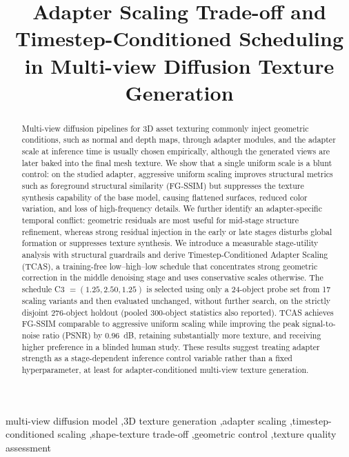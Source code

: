 \documentclass[times,twocolumn,final]{elsarticle}
\begin{document}
\begin{frontmatter}

\title{Adapter Scaling Trade-off and Timestep-Conditioned Scheduling in Multi-view Diffusion Texture Generation}


\begin{abstract}
Multi-view diffusion pipelines for 3D asset texturing commonly inject geometric conditions, such as normal and depth maps, through adapter modules, and the adapter scale at inference time is usually chosen empirically, although the generated views are later baked into the final mesh texture. We show that a single uniform scale is a blunt control: on the studied adapter, aggressive uniform scaling improves structural metrics such as foreground structural similarity (FG-SSIM) but suppresses the texture synthesis capability of the base model, causing flattened surfaces, reduced color variation, and loss of high-frequency details. We further identify an adapter-specific temporal conflict: geometric residuals are most useful for mid-stage structure refinement, whereas strong residual injection in the early or late stages disturbs global formation or suppresses texture synthesis. We introduce a measurable stage-utility analysis with structural guardrails and derive Timestep-Conditioned Adapter Scaling (TCAS), a training-free low--high--low schedule that concentrates strong geometric correction in the middle denoising stage and uses conservative scales otherwise. The schedule C3 $=(1.25, 2.50, 1.25)$ is selected using only a 24-object probe set from 17 scaling variants and then evaluated unchanged, without further search, on the strictly disjoint 276-object holdout (pooled 300-object statistics also reported). TCAS achieves FG-SSIM comparable to aggressive uniform scaling while improving the peak signal-to-noise ratio (PSNR) by 0.96~dB, retaining substantially more texture, and receiving higher preference in a blinded human study. These results suggest treating adapter strength as a stage-dependent inference control variable rather than a fixed hyperparameter, at least for adapter-conditioned multi-view texture generation.
\end{abstract}

\begin{keyword}
\KWD
multi-view diffusion model \sep 3D texture generation \sep adapter scaling \sep timestep-conditioned scaling \sep shape-texture trade-off \sep geometric control \sep texture quality assessment
\end{keyword}

\end{frontmatter}
\end{document}
